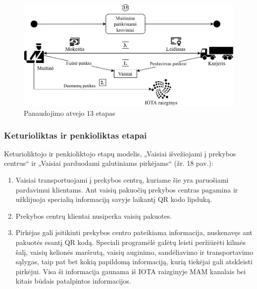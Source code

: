 \begin{figure}[H]
    \centering
    \includegraphics[scale=0.8]{images/iota-usecase-13}
    \caption{Panaudojimo atvejo 13 etapas}
\end{figure}




\subsubsection{Keturioliktas ir penkioliktas etapai}

Keturioliktojo ir penkioliktojo etapų modelis, „Vaisiai išvežiojami į prekybos centrus“ ir „Vaisiai parduodami galutiniams pirkėjams“ (žr. 18 pav.):
\begin{enumerate}
    \item Vaisiai transportuojami į prekybos centrą, kuriame šie yra paruošiami pardavimui klientams. Ant vaisių pakuočių prekybos centras pagamina ir užklijuoja specialią informaciją savyje laikantį QR kodo lipduką.
    \item Prekybos centrų klientai nusiperka vaisių pakuotes.
    \item Pirkėjas gali įsitikinti prekybos centro pateikiama informacija, nuskenavęs ant pakuotės esantį QR kodą. Speciali programėlė galėtų leisti peržiūrėti kilmės šalį, vaisių kelionės maršrutą, vaisių auginimo, sandėliavimo ir transportavimo sąlygas, taip pat bet kokią papildomą informaciją, kurią tiekėjai gali atskleisti pirkėjui. Visa ši informacija gaunama iš IOTA raizginyje MAM kanalais bei kitais būdais patalpintos informacijos.
\end{enumerate}


